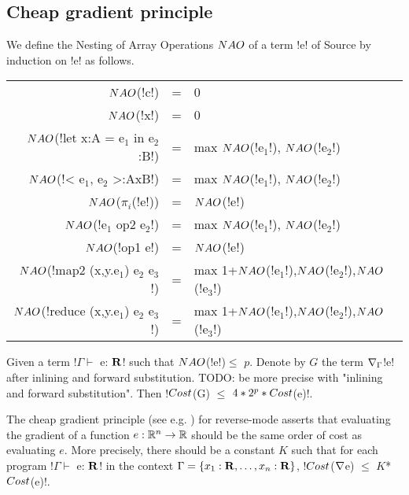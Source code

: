 \subsection{Cheap gradient principle}

We define the Nesting of Array Operations $NAO$ of a term !e! of Source by induction on !e! as follows.

\begin{tabular}{r c l}
    $NAO$(!c!) &=& 0 \\
    $NAO$(!x!) &=& 0 \\
    $NAO$(!let x:A = e$_1$ in e$_2$:B!) &=& max $NAO$(!e$_1$!), $NAO$(!e$_2$!)  \\ 
    $NAO$(!< e$_1$, e$_2$ >:AxB!) &=& max $NAO$(!e$_1$!), $NAO$(!e$_2$!) \\ 
    $NAO$($\pi_i$(!e!)) &=& $NAO$(!e!)\\
    $NAO$(!e$_1$ op2 e$_2$!) &=& max $NAO$(!e$_1$!), $NAO$(!e$_2$!)\\
    $NAO$(!op1 e!) &=& $NAO$(!e!) \\
    $NAO$(!map2 (x,y.e$_1$) e$_2$ e$_3$!) &=& max 1+$NAO$(!e$_1$!),$NAO$(!e$_2$!),$NAO$(!e$_3$!) \\
    $NAO$(!reduce (x,y.e$_1$) e$_2$ e$_3$!) &=& max 1+$NAO$(!e$_1$!),$NAO$(!e$_2$!),$NAO$(!e$_3$!) \\
\end{tabular}

\begin{theorem}
    \label{thm:complexity}
    Given a term !$\Gamma \vdash$ e: $\mathbf{R}$! such that $NAO$(!e!)$\leq$ $p$.
    Denote by $G$ the term $\nabla_\Gamma$!e! after inlining and forward substitution.
    TODO: be more precise with "inlining and forward substitution".
    Then !$Cost$(G) $\leq$ $4*2^{p}*Cost$(e)!.
\end{theorem}

The cheap gradient principle (see e.g. \cite{griewank2008evaluating}) for reverse-mode
asserts that evaluating the gradient of a function $e:\mathbb{R}^n\to\mathbb{R}$ 
should be the same order of cost as evaluating $e$. 
More precisely, there should be a constant $K$ such that for each program !$\Gamma \vdash$ e: $\mathbf{R}$! in the context $\Gamma=\{x_1:\mathbf{R},\ldots,x_n:\mathbf{R}\}$,
 !$Cost$($\nabla$e) $\leq$ $K$*$Cost$(e)!.

